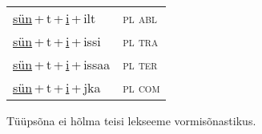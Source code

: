 \begin{minipage}{\textwidth}
\begin{sideways}
\begin{tabular}{l l}
\underline{sün}\,+\,t\,+\,\underline{i}\,+\,ilt & \textsc{ pl abl } \\
\underline{sün}\,+\,t\,+\,\underline{i}\,+\,issi & \textsc{ pl tra } \\
\underline{sün}\,+\,t\,+\,\underline{i}\,+\,issaa & \textsc{ pl ter } \\
\underline{sün}\,+\,t\,+\,\underline{i}\,+\,jka & \textsc{ pl com } \\
\end{tabular}
\end{sideways}
\label{tab:tüüpsõnamall-sünti}

\end{minipage}

 
\vspace{1em}
\noindent Tüüpsõna ei hõlma teisi lekseeme vormi\-sõnastikus.
